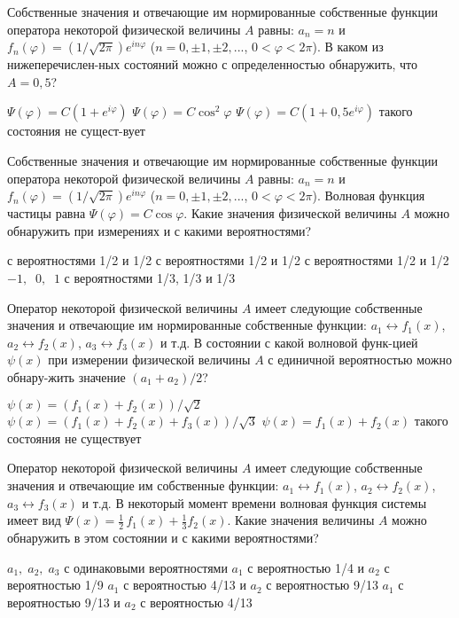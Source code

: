 \documentclass[11pt,a4paper]{exam}
\begin{document}
\begin{questions}
\question Собственные значения и отвечающие им нормированные собственные функции оператора некоторой физической величины $A$ равны: ${a_n} = n$ и ${f_n}(\varphi ) = \left( {1/\sqrt {2\pi } } \right){e^{in\varphi }}$ ($n = 0, \pm 1, \pm 2,...$, $0 < \varphi  < 2\pi $). В каком из нижеперечислен-ных состояний можно с определенностью обнаружить, что $A = 0,5$? 
\begin{choices}
\choice $\Psi (\varphi ) = C\left( {1 + {e^{i\varphi }}} \right)$       
\choice $\Psi (\varphi ) = C{\cos ^2}\varphi $
\choice $\Psi (\varphi ) = C\left( {1 + 0,5{e^{i\varphi }}} \right)$       
\choice такого состояния не сущест-вует
\end{choices}

\question Собственные значения и отвечающие им нормированные собственные функции оператора некоторой физической величины $A$ равны: ${a_n} = n$ и ${f_n}(\varphi ) = \left( {1/\sqrt {2\pi } } \right){e^{in\varphi }}$ ($n = 0, \pm 1, \pm 2,...$, $0 < \varphi  < 2\pi $). Волновая функция частицы равна $\Psi (\varphi ) = C\cos \varphi $. Какие значения физической величины $A$ можно обнаружить при измерениях и с какими вероятностями? 
\begin{choices}
\choice  с вероятностями 1/2 и 1/2     
\choice  с вероятностями 1/2 и 1/2
\choice  с вероятностями 1/2 и 1/2     
\choice $ - 1,\;\;0,\;\;1$ с вероятностями 1/3, 1/3 и 1/3 
\end{choices}

\question Оператор некоторой физической величины $A$ имеет следующие собственные значения и отвечающие им нормированные собственные функции: ${a_1} \leftrightarrow {f_1}(x)$, ${a_2} \leftrightarrow {f_2}(x)$, ${a_3} \leftrightarrow {f_3}(x)$ и т.д. В состоянии с какой волновой функ-цией $\psi (x)$ при измерении физической величины $A$ с единичной вероятностью можно обнару-жить значение $({a_1} + {a_2})/2$?
\begin{choices}
\choice $\psi (x) = \left( {{f_1}(x) + {f_2}(x)} \right)/\sqrt 2 $      
\choice $\psi (x) = \left( {{f_1}(x) + {f_2}(x) + {f_3}(x)} \right)/\sqrt 3 $
\choice $\psi (x) = {f_1}(x) + {f_2}(x)$        
\choice такого состояния не существует
\end{choices}

\question Оператор некоторой физической величины $A$ имеет следующие собственные значения и отвечающие им собственные функции: ${a_1} \leftrightarrow {f_1}(x)$, ${a_2} \leftrightarrow {f_2}(x)$, ${a_3} \leftrightarrow {f_3}(x)$ и т.д. В некоторый момент времени волновая функция системы имеет вид $\Psi (x) = \frac{1}{2}\,{f_1}(x) + \frac{1}{3}{f_2}(x)$. Какие значения величины $A$ можно обнаружить в этом состоянии и с какими вероятностями? 
\begin{choices}
\choice ${a_1},\;{a_2},\;{a_3}$ с одинаковыми вероятностями
\choice ${a_1}$ с вероятностью 1/4 и ${a_2}$ с вероятностью 1/9 
\choice ${a_1}$ с вероятностью 4/13 и ${a_2}$ с вероятностью 9/13
\choice ${a_1}$ с вероятностью 9/13 и ${a_2}$ с вероятностью 4/13
\end{choices}


\end{questions}
\end{document}
